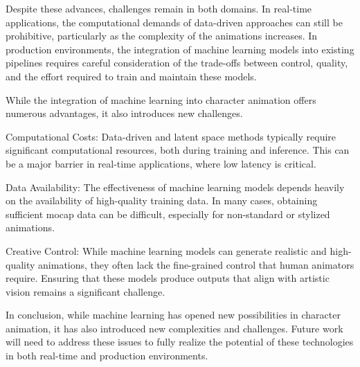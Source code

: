 \documentclass[../../main.tex]{subfiles}
\begin{document}
Despite these advances, challenges remain in both domains. In real-time applications, the computational demands of data-driven approaches can still be prohibitive, particularly as the complexity of the animations increases. In production environments, the integration of machine learning models into existing pipelines requires careful consideration of the trade-offs between control, quality, and the effort required to train and maintain these models.

While the integration of machine learning into character animation offers numerous advantages, it also introduces new challenges.

Computational Costs: Data-driven and latent space methods typically require significant computational resources, both during training and inference. This can be a major barrier in real-time applications, where low latency is critical.

Data Availability: The effectiveness of machine learning models depends heavily on the availability of high-quality training data. In many cases, obtaining sufficient mocap data can be difficult, especially for non-standard or stylized animations.

Creative Control: While machine learning models can generate realistic and high-quality animations, they often lack the fine-grained control that human animators require. Ensuring that these models produce outputs that align with artistic vision remains a significant challenge.

In conclusion, while machine learning has opened new possibilities in character animation, it has also introduced new complexities and challenges. Future work will need to address these issues to fully realize the potential of these technologies in both real-time and production environments.
\end{document}
